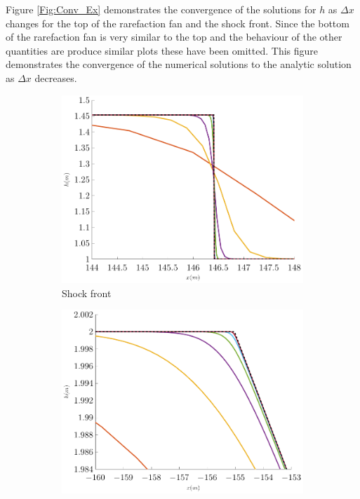 \documentclass[10pt]{elsarticle}
\begin{document}
Figure \ref{Fig:Conv_Ex} demonstrates the convergence of the solutions for $h$ as $\Delta x$ changes for the top of the rarefaction fan and the shock front. Since the bottom of the rarefaction fan is very similar to the top  and the behaviour of the other quantities are produce similar plots these have been omitted. This figure demonstrates the convergence of the numerical solutions to the analytic solution as $\Delta x$ decreases.
\begin{figure}
	\centering
	\begin{subfigure}{0.45\textwidth}
		\centering
		\includegraphics[width=\textwidth]{./Figures/Simulations/Validation/DBSWWE/hFront.pdf}
		\caption{Shock front}
	\end{subfigure}
	\begin{subfigure}{0.45\textwidth}
		\centering
		\includegraphics[width=\textwidth]{./Figures/Simulations/Validation/DBSWWE/hRFTop.pdf}

\end{subfigure}
\end{figure}
\end{document}
